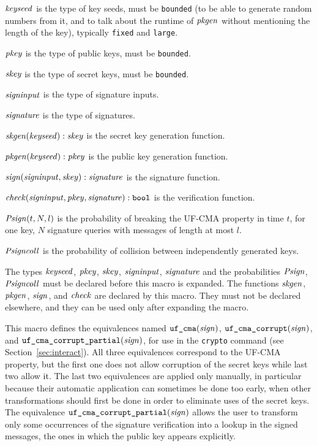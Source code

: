 \documentclass{article}
\begin{document}
\begin{itemize}
   $\mathit{keyseed}$ is the type of key seeds, must be \texttt{bounded} (to be able to generate random numbers from it, and to talk about
  the runtime of $\mathit{pkgen}$ without mentioning the length of the key), typically \texttt{fixed} and \texttt{large}.

   $\mathit{pkey}$ is the type of public keys, must be \texttt{bounded}.

   $\mathit{skey}$ is the type of secret keys, must be \texttt{bounded}.

  $\mathit{signinput}$ is the type of signature inputs.

   $\mathit{signature}$ is the type of signatures.

   $\mathit{skgen}(\mathit{keyseed}): \mathit{skey}$ is the secret key generation function.

   $\mathit{pkgen}(\mathit{keyseed}): \mathit{pkey}$ is the public key generation function.

   $\mathit{sign}(\mathit{signinput}, \mathit{skey}): \mathit{signature}$ is the signature function.

   $\mathit{check}(\mathit{signinput}, \mathit{pkey}, \mathit{signature}): \texttt{bool}$ is the
  verification function.

   $\mathit{Psign}(t, N, l)$ is the probability of breaking the UF-CMA property
   in time $t$, for one key, $N$ signature queries with messages of length
   at most $l$.

   $\mathit{Psigncoll}$ is the probability of collision between independently generated keys.

   The types $\mathit{keyseed}$, $\mathit{pkey}$, $\mathit{skey}$, $\mathit{signinput}$,
   $\mathit{signature}$ and the probabilities $\mathit{Psign}$, $\mathit{Psigncoll}$ must
   be declared before this macro is expanded. The functions
   $\mathit{skgen}$, $\mathit{pkgen}$, $\mathit{sign}$, and $\mathit{check}$ are declared by this
   macro. They must not be declared elsewhere, and they can be used
   only after expanding the macro.

   This macro defines the equivalences named
   $\texttt{uf\_cma}(\mathit{sign})$,
   $\texttt{uf\_cma\_corrupt}(\mathit{sign})$, and
   $\texttt{uf\_cma\_corrupt\_partial}(\mathit{sign})$, for use in the
   \texttt{crypto} command (see Section~\ref{sec:interact}).
   All three equivalences correspond to the UF-CMA property, but the first one 
   does not allow corruption of the secret keys while last two allow it.
   The last two equivalences are applied only manually, in particular because their automatic
   application can sometimes be done too early, when other transformations
   should first be done in order to eliminate uses of the secret keys.
   The equivalence $\texttt{uf\_cma\_corrupt\_partial}(\mathit{sign})$ allows the
   user to transform only some occurrences of the signature verification into a 
   lookup in the signed messages, the ones in which the public key appears explicitly.  


\end{itemize}
\end{document}
